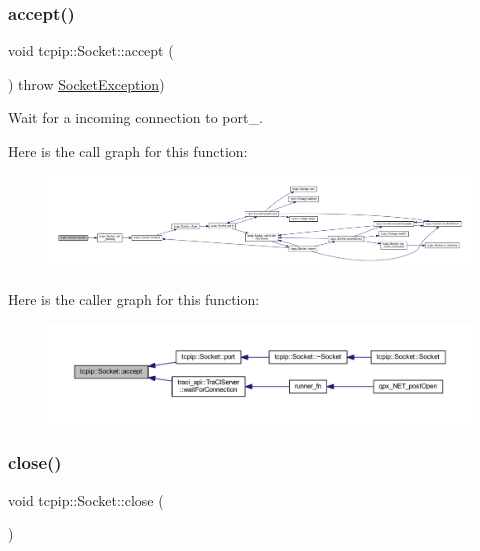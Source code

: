 \subsubsection{\texorpdfstring{accept()}{accept()}}
{\footnotesize\ttfamily void tcpip\+::\+Socket\+::accept (\begin{DoxyParamCaption}{ }\end{DoxyParamCaption}) throw  \hyperlink{classtcpip_1_1_socket_exception}{Socket\+Exception}) }



Wait for a incoming connection to port\+\_\+. 

Here is the call graph for this function\+:\nopagebreak
\begin{figure}[H]
\begin{center}
\leavevmode
\includegraphics[width=350pt]{classtcpip_1_1_socket_a7847299f806a73798f4ceb95ab0e3d51_cgraph}
\end{center}
\end{figure}
Here is the caller graph for this function\+:\nopagebreak
\begin{figure}[H]
\begin{center}
\leavevmode
\includegraphics[width=350pt]{classtcpip_1_1_socket_a7847299f806a73798f4ceb95ab0e3d51_icgraph}
\end{center}
\end{figure}
\mbox{\label{classtcpip_1_1_socket_adda6f45e2b5fabc7f539f4ddcbe4b144}} 
\subsubsection{\texorpdfstring{close()}{close()}}
{\footnotesize\ttfamily void tcpip\+::\+Socket\+::close (\begin{DoxyParamCaption}{ }\end{DoxyParamCaption})}

